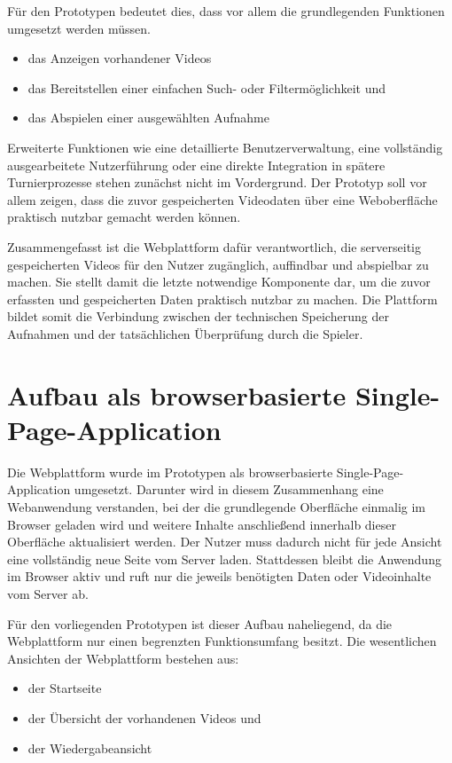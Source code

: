 Für den Prototypen bedeutet dies, dass vor allem die grundlegenden Funktionen umgesetzt werden müssen. 

\begin{itemize} 
    \item das Anzeigen vorhandener Videos
    \item das Bereitstellen einer einfachen Such- oder Filtermöglichkeit und 
    \item das Abspielen einer ausgewählten Aufnahme
\end{itemize}

Erweiterte Funktionen wie eine detaillierte Benutzerverwaltung, eine vollständig ausgearbeitete Nutzerführung oder eine direkte Integration in spätere Turnierprozesse stehen zunächst nicht im Vordergrund. Der Prototyp soll vor allem zeigen, 
dass die zuvor gespeicherten Videodaten über eine Weboberfläche praktisch nutzbar gemacht werden können. 

Zusammengefasst ist die Webplattform dafür verantwortlich, die serverseitig gespeicherten Videos für den Nutzer zugänglich, auffindbar und abspielbar zu machen. Sie stellt damit die letzte notwendige Komponente dar, um die zuvor erfassten und gespeicherten Daten praktisch nutzbar zu machen. 
Die Plattform bildet somit die Verbindung zwischen der technischen Speicherung der Aufnahmen und der tatsächlichen Überprüfung durch die Spieler.

\section{Aufbau als browserbasierte Single-Page-Application} 

Die Webplattform wurde im Prototypen als browserbasierte Single-Page-Application \cite{mdn_spa_2025} umgesetzt. Darunter wird in diesem Zusammenhang eine Webanwendung verstanden, bei der die grundlegende Oberfläche einmalig im Browser geladen wird und weitere Inhalte anschließend innerhalb dieser Oberfläche aktualisiert werden. 
Der Nutzer muss dadurch nicht für jede Ansicht eine vollständig neue Seite vom Server laden. Stattdessen bleibt die Anwendung im Browser aktiv und ruft nur die jeweils benötigten Daten oder Videoinhalte vom Server ab. 

Für den vorliegenden Prototypen ist dieser Aufbau naheliegend, da die Webplattform nur einen begrenzten Funktionsumfang besitzt. Die wesentlichen Ansichten der Webplattform bestehen aus: 

\begin{itemize} 
    \item der Startseite
    \item der Übersicht der vorhandenen Videos und 
    \item der Wiedergabeansicht
\end{itemize} 

